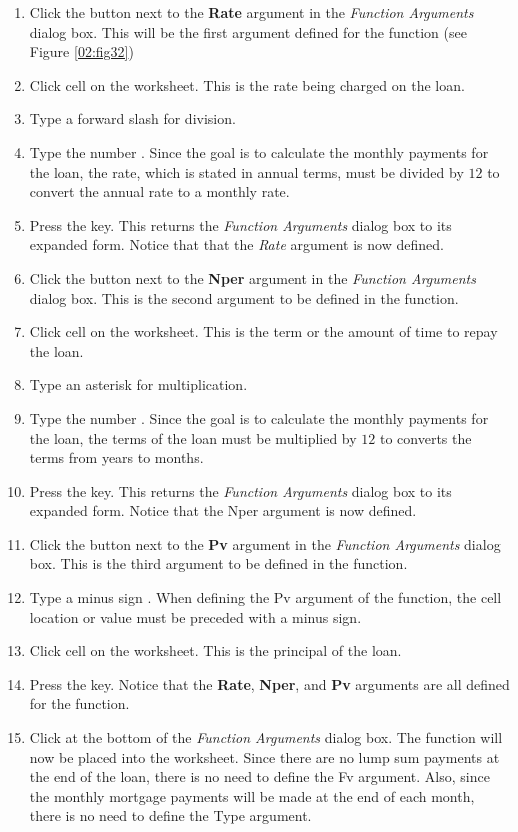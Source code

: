 \begin{enumerate}[resume]
	\item Click the  button next to the \textbf{Rate} argument in the \textit{Function Arguments} dialog box. This will be the first argument defined for the function (see Figure \ref{02:fig32})
	\item Click cell  on the worksheet. This is the rate being charged on the loan.
	\item Type a forward slash \fmtTyping{/} for division.
	\item Type the number . Since the goal is to calculate the monthly payments for the loan, the rate, which is stated in annual terms, must be divided by $ 12 $ to convert the annual rate to a monthly rate.
	\item Press the  key. This returns the \textit{Function Arguments} dialog box to its expanded form. Notice that that the \textit{Rate} argument is now defined.
	\item Click the  button next to the \textbf{Nper} argument in the \textit{Function Arguments} dialog box. This is the second argument to be defined in the function.
	\item Click cell  on the worksheet. This is the term or the amount of time to repay the loan.
	\item Type an asterisk \fmtTyping{*} for multiplication.
	\item Type the number . Since the goal is to calculate the monthly payments for the loan, the terms of the loan must be multiplied by $ 12 $ to converts the terms from years to months.
	\item Press the  key. This returns the \textit{Function Arguments} dialog box to its expanded form. Notice that the Nper argument is now defined.
	\item Click the  button next to the \textbf{Pv} argument in the \textit{Function Arguments} dialog box. This is the third argument to be defined in the function.
	\item Type a minus sign \fmtTyping{-}. When defining the Pv argument of the  function, the cell location or value must be preceded with a minus sign.
	\item Click cell  on the worksheet. This is the principal of the loan.
	\item Press the  key. Notice that the \textbf{Rate}, \textbf{Nper}, and \textbf{Pv} arguments are all defined for the function.
	\item Click  at the bottom of the \textit{Function Arguments} dialog box. The function will now be placed into the worksheet. Since there are no lump sum payments at the end of the loan, there is no need to define the Fv argument. Also, since the monthly mortgage payments will be made at the end of each month, there is no need to define the Type argument.
\end{enumerate}

